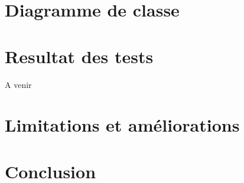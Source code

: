 \documentclass[10pt,a4paper]{article}
\begin{document}
\section*{Diagramme de classe}

\section*{Resultat des tests}

A venir

\section*{Limitations et améliorations}


\section*{Conclusion}

 
\end{document}
